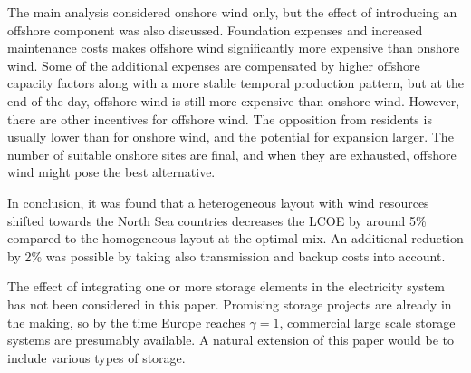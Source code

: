 \documentclass[a4paper, 5p, sort&compress]{elsarticle}%
\begin{document}
The main analysis considered onshore wind only, but the effect of
introducing an offshore component was also discussed. Foundation
expenses and increased maintenance costs makes offshore wind
significantly more expensive than onshore wind. Some of the additional
expenses are compensated by higher offshore capacity factors along
with a more stable temporal production pattern, but at the end of the
day, offshore wind is still more expensive than onshore wind. However,
there are other incentives for offshore wind. The opposition from
residents is usually lower than for onshore wind, and the potential
for expansion larger. The number of suitable onshore sites are final,
and when they are exhausted, offshore wind might pose the best
alternative.


In conclusion, it was found that a heterogeneous layout with wind
resources shifted towards the North Sea countries decreases the LCOE
by around 5\% compared to the homogeneous layout at the optimal mix. An
additional reduction by 2\% was possible by taking also transmission
and backup costs into account. \newline

The effect of integrating one or more storage elements in the
electricity system has not been considered in this paper. Promising
storage projects are already in the making, so by the time Europe reaches
$\gamma = 1$, commercial large scale storage systems are presumably
available. A natural extension of this paper would be to include
various types of storage.



\end{document}
